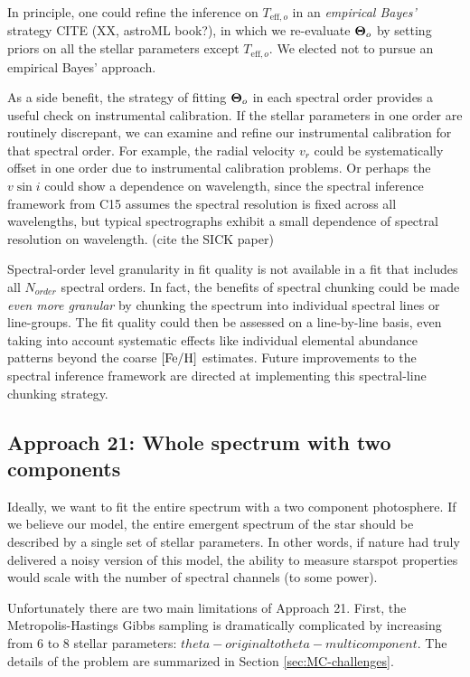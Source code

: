 \documentclass[onecolumn]{emulateapj}%
\newcommand{\iancze}{{\sc C15 }}
\begin{document}
In principle, one could refine the inference on $T_{\mathrm{eff},o}$ in an \emph{empirical Bayes'} strategy CITE (XX, astroML book?), in which we re-evaluate ${\bm \Theta}_o$ by setting priors on all the stellar parameters except $T_{\mathrm{eff},o}$.  We elected not to pursue an empirical Bayes' approach.

As a side benefit, the strategy of fitting ${\bm \Theta}_o$ in each spectral order provides a useful check on instrumental calibration. If the stellar parameters in one order are routinely discrepant, we can examine and refine our instrumental calibration for that spectral order.  For example, the radial velocity $v_r$ could be systematically offset in one order due to instrumental calibration problems.  Or perhaps the $v\sin{i}$ could show a dependence on wavelength, since the spectral inference framework from \iancze assumes the spectral resolution is fixed across all wavelengths, but typical spectrographs exhibit a small dependence of spectral resolution on wavelength.  (cite the SICK paper)

Spectral-order level granularity in fit quality is not available in a fit that includes all $N_{order}$ spectral orders.  In fact, the benefits of spectral chunking could be made \emph{even more granular} by chunking the spectrum into individual spectral lines or line-groups.  The fit quality could then be assessed on a line-by-line basis, even taking into account systematic effects like individual elemental abundance patterns beyond the coarse $[{\rm Fe}/{\rm H}]$ estimates.  Future improvements to the spectral inference framework are directed at implementing this spectral-line chunking strategy.  

\subsection{Approach 21: Whole spectrum with two components}
\label{sec:approach21}

Ideally, we want to fit the entire spectrum with a two component photosphere.  If we believe our model, the entire emergent spectrum of the star should be described by a single set of stellar parameters.  In other words, if nature had truly delivered a noisy version of this model, the ability to measure starspot properties would scale with the number of spectral channels (to some power).

Unfortunately there are two main limitations of Approach 21.  First, the Metropolis-Hastings Gibbs sampling is dramatically complicated by increasing from 6 to 8 stellar parameters: $theta-original to theta-multicomponent$.  The details of the problem are summarized in Section \ref{sec:MC-challenges}.
\end{document}

